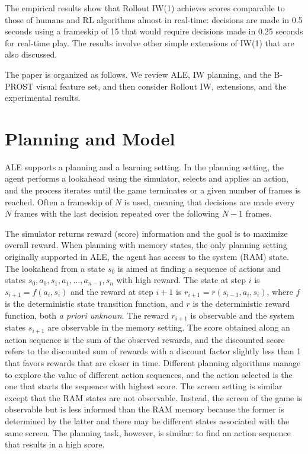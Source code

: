 \documentclass[letterpaper]{article}
\begin{document}
The empirical results show that Rollout IW(1)
achieves  scores comparable to those of humans and RL algorithms
almost in real-time: decisions are made in 0.5 seconds
using a frameskip of 15  that would require decisions made in  0.25 seconds
for real-time play. The results involve other simple extensions of IW(1) that
are also discussed.

The paper is organized as follows. We review ALE, IW planning, and the B-PROST
visual feature set, and then consider Rollout IW, extensions, and the experimental
results.


\section{Planning and  Model}

ALE supports a planning and a learning setting. In the planning setting,
the agent performs a lookahead   using the   simulator,
selects and applies  an action, and the process iterates until the game
terminates or a given number of frames is reached.
Often a frameskip of $N$ is used, meaning that decisions are made
every $N$ frames with the  last decision repeated over the following
$N\!-\!1$ frames.

The simulator returns reward (score) information and the goal is to maximize overall reward.  When planning with
memory states, the only planning setting originally supported in ALE, the agent has access to the
system (RAM) state. The lookahead from a state $s_0$ is  aimed  at finding a
sequence of  actions and states  $s_0,a_0,s_1,a_1, \ldots, a_{n-1}, s_n$ with high reward.
The  state at step $i$ is $s_{i+1}=f(a_i,s_i)$ and the reward at step $i+1$ is $r_{i+1}=r(s_{i-1},a_i,s_i)$,
where $f$ is the deterministic state transition function, and $r$ is the deterministic reward function,
both \emph{a priori unknown}. The reward $r_{i+1}$ is observable and
the system states $s_{i+1}$ are observable in the memory setting.
The score obtained along an action sequence is the sum of the observed rewards, and
the discounted score refers to the discounted sum of rewards with
a discount factor slightly less than 1 that favors rewards that are closer in time.
Different planning algorithms manage to explore the value of
different action sequences, and the action selected is the  one that starts
the sequence with highest score. The screen setting is similar except that the
RAM states are not observable. Instead, the screen of the game
is observable but is less informed than the RAM memory  because the former is determined
by the latter and there may be different states associated with the same screen.
The planning task, however, is similar: to find an action sequence that results
in a high score.
\end{document}
